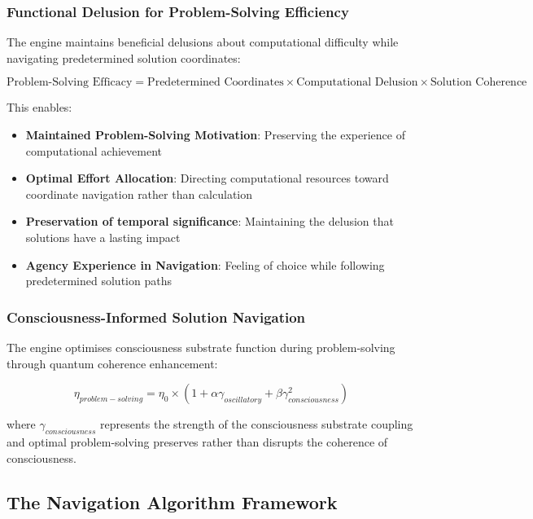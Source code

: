 \documentclass[11pt,a4paper]{article}
\theoremstyle{remark}
\begin{document}
\subsubsection{Functional Delusion for Problem-Solving Efficiency}

The engine maintains beneficial delusions about computational difficulty while navigating predetermined solution coordinates:

\begin{equation}
\text{Problem-Solving Efficacy} = \text{Predetermined Coordinates} \times \text{Computational Delusion} \times \text{Solution Coherence}
\end{equation}

This enables:
\begin{itemize}
\item \textbf{Maintained Problem-Solving Motivation}: Preserving the experience of computational achievement
\item \textbf{Optimal Effort Allocation}: Directing computational resources toward coordinate navigation rather than calculation
\item \textbf{Preservation of temporal significance}: Maintaining the delusion that solutions have a lasting impact
\item \textbf{Agency Experience in Navigation}: Feeling of choice while following predetermined solution paths
\end{itemize}


\subsubsection{Consciousness-Informed Solution Navigation}

The engine optimises consciousness substrate function during problem-solving through quantum coherence enhancement:

\begin{equation}
\eta_{problem-solving} = \eta_0 \times (1 + \alpha \gamma_{oscillatory} + \beta \gamma_{consciousness}^2)
\end{equation}

where $\gamma_{consciousness}$ represents the strength of the consciousness substrate coupling and optimal problem-solving preserves rather than disrupts the coherence of consciousness.

\subsection{The Navigation Algorithm Framework}
\end{document}
